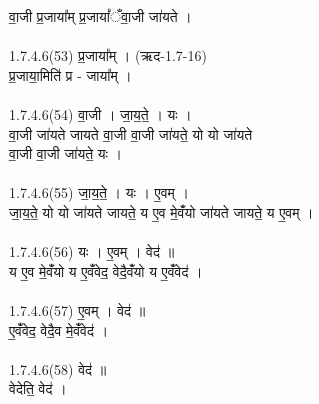 वा॒जी प्र॒जाया᳚म् प्र॒जायां᳚ँवा॒जी जा॑यते ।\\
\\
1.7.4.6(53)  प्र॒जाया᳚म् । (ऋद-1.7-16)\\
प्र॒जाया॒मिति॑ प्र - जाया᳚म् ।\\
\\
1.7.4.6(54)  वा॒जी । जा॒य॒ते॒ । यः ।\\
वा॒जी जा॑यते जायते वा॒जी वा॒जी जा॑यते॒ यो यो जा॑यते\\
वा॒जी वा॒जी जा॑यते॒ यः ।\\
\\
1.7.4.6(55)  जा॒य॒ते॒ । यः । ए॒वम् ।\\
जा॒य॒ते॒ यो यो जा॑यते जायते॒ य ए॒व मे॒वंँयो जा॑यते जायते॒ य ए॒वम् ।\\
\\
1.7.4.6(56)  यः । ए॒वम् । वेद॑ ॥\\
य ए॒व मे॒वंँयो य ए॒वंँवेद॒ वेदै॒वंँयो य ए॒वंँवेद॑ ।\\
\\
1.7.4.6(57)  ए॒वम् । वेद॑ ॥\\
ए॒वंँवेद॒ वेदै॒व मे॒वंँवेद॑ ।\\
\\
1.7.4.6(58)  वेद॑ ॥\\
वेदेति॒ वेद॑ ।\\\